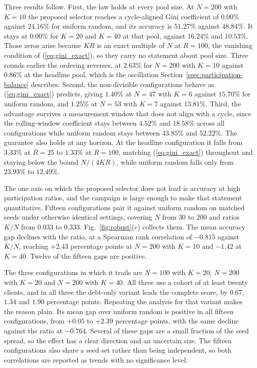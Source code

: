 \documentclass[journal]{IEEEtran}
\newcommand{\rev}[1]{{\color{blue}#1}}
\begin{document}
\rev{Three results follow. First, the law holds at every pool size. At $N = 200$ with $K = 10$ the proposed selector reaches a cycle-aligned Gini coefficient of $0.00\%$ against $24.16\%$ for uniform random, and its accuracy is $51.27\%$ against $48.84\%$. It stays at $0.00\%$ for $K = 20$ and $K = 40$ at that pool, against $16.24\%$ and $10.53\%$. Those zeros arise because $KR$ is an exact multiple of $N$ at $R = 100$, the vanishing condition of (\ref{eq:gini_exact}), so they carry no statement about pool size. Three rounds earlier the ordering reverses, at $2.63\%$ for $N=200$ with $K=10$ against $0.86\%$ at the headline pool, which is the oscillation Section~\ref{ssec:participation-balance} describes. Second, the non-divisible configurations behave as (\ref{eq:gini_exact}) predicts, giving $1.40\%$ at $N = 47$ with $K = 6$ against $15.70\%$ for uniform random, and $1.25\%$ at $N = 53$ with $K = 7$ against $13.81\%$. Third, the advantage survives a measurement window that does not align with a cycle, since the rolling-window coefficient stays between $4.52\%$ and $18.58\%$ across all configurations while uniform random stays between $43.85\%$ and $52.22\%$. The guarantee also holds at any horizon. At the headline configuration it falls from $3.33\%$ at $R = 25$ to $1.33\%$ at $R = 100$, matching (\ref{eq:gini_exact}) throughout and staying below the bound $N/(4KR)$, while uniform random falls only from $23.93\%$ to $12.49\%$.}

\rev{The one axis on which the proposed selector does not lead is accuracy at high participation ratios, and the campaign is large enough to make that statement quantitative. Fifteen configurations pair it against uniform random on matched seeds under otherwise identical settings, covering $N$ from $30$ to $200$ and ratios $K/N$ from $0.033$ to $0.333$. Fig.~\ref{fig:robust}(c) collects them. The mean accuracy gap declines with the ratio, at a Spearman rank correlation of $-0.815$ against $K/N$, reaching $+2.43$ percentage points at $N=200$ with $K=10$ and $-1.42$ at $K=40$. Twelve of the fifteen gaps are positive.}


\rev{The three configurations in which it trails are $N = 100$ with $K = 20$, $N = 200$ with $K = 20$ and $N = 200$ with $K = 40$. All three use a cohort of at least twenty clients, and in all three the debt-only variant leads the complete score, by $0.67$, $1.34$ and $1.90$ percentage points. Repeating the analysis for that variant makes the reason plain. Its mean gap over uniform random is positive in all fifteen configurations, from $+0.05$ to $+2.39$ percentage points, with the same decline against the ratio at $-0.764$. Several of these gaps are a small fraction of the seed spread, so the effect has a clear direction and an uncertain size. The fifteen configurations also share a seed set rather than being independent, so both correlations are reported as trends with no significance level.}
\end{document}
